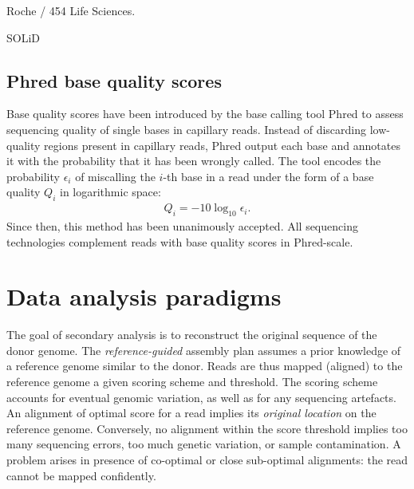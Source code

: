 Roche / 454 Life Sciences.

SOLiD

\subsection{Phred base quality scores}
\label{sec:background:hts:phred}

Base quality scores have been introduced by the base calling tool Phred \citep{Ewing1998, Ewing1998a} to assess sequencing quality of single bases in capillary reads.
Instead of discarding low-quality regions present in capillary reads, Phred output each base and annotates it with the probability that it has been wrongly called.
The tool encodes the probability $\epsilon_i$ of miscalling the $i$-th base in a read under the form of a base quality $Q_i$ in logarithmic space:
\begin{eqnarray}
\label{eq:phred}
Q_i = -10 \log_{10} \epsilon_i.
\end{eqnarray}
Since then, this method has been unanimously accepted.
All sequencing technologies complement reads with base quality scores in Phred-scale.


\section{Data analysis paradigms}
\label{sec:paradigms}

The goal of secondary analysis is to reconstruct the original sequence of the donor genome.
The \emph{reference-guided} assembly plan assumes a prior knowledge of a reference genome similar to the donor.
Reads are thus mapped (\ie aligned) to the reference genome \wrt a given scoring scheme and threshold.
The scoring scheme accounts for eventual genomic variation, as well as for any sequencing artefacts.
An alignment of optimal score for a read implies its \emph{original location} on the reference genome.
Conversely, no alignment within the score threshold implies too many sequencing errors, too much genetic variation, or sample contamination.
A problem arises in presence of co-optimal or close sub-optimal alignments: the read cannot be mapped confidently.

